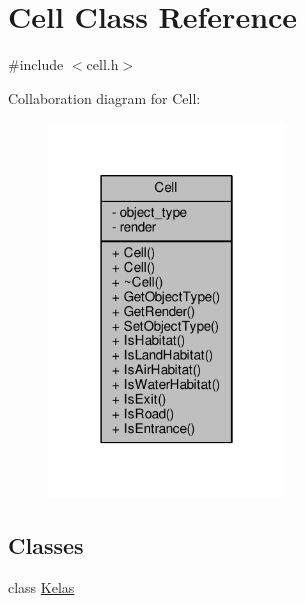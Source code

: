 \hypertarget{classCell}{}\section{Cell Class Reference}
\label{classCell}


{\ttfamily \#include $<$cell.\+h$>$}



Collaboration diagram for Cell\+:
\nopagebreak
\begin{figure}[H]
\begin{center}
\leavevmode
\includegraphics[width=178pt]{classCell__coll__graph}
\end{center}
\end{figure}
\subsection*{Classes}
\begin{DoxyCompactItemize}
\item 
class \hyperlink{classCell_1_1Kelas}{Kelas}
\end{DoxyCompactItemize}
